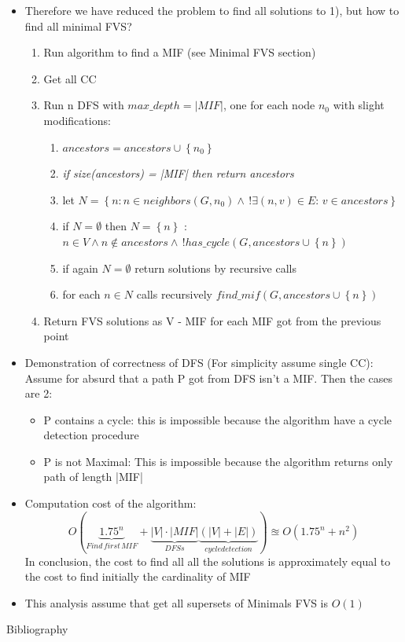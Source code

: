 \documentclass[11pt]{beamer}
\begin{document}
	\begin{frame}
		\begin{itemize}
			\item Therefore we have reduced the problem to find all solutions to 1), but how to find all minimal FVS?
			\begin{enumerate}
				\item Run algorithm to find a MIF (see Minimal FVS section)
				\item Get all CC
				\item Run n DFS with $ max\_depth=|MIF| $, one for each node $ n_0 $ with slight modifications:
				\begin{enumerate}
					\item $ ancestors = ancestors \cup \left\{ n_0 \right\} $
					\item \textit{if size(ancestors) = |MIF| then return ancestors}
					\item let $ N = \left\{ n: n \in neighbors(G, n_0) \wedge \, ! \exists (n,v) \in E: \, v \in ancestors \right\} $
					\item if $ N = \emptyset $ then $ N = \left\{ n \right\}  $ : $ n \in V \wedge n \notin ancestors \wedge \, ! has\_cycle(G, ancestors \cup \left\{ n \right\})$
					\item if again $ N = \emptyset $ return solutions by recursive calls
					\item for each $ n \in N $ calls recursively $ find\_mif \left( G, ancestors \cup \left\{ n \right\} \right) $
					
				\end{enumerate}
				\item Return FVS solutions as V - MIF for each MIF got from the previous point
			\end{enumerate}
		\end{itemize}
	\end{frame}
	\begin{frame}
		\begin{itemize}
			\item Demonstration of correctness of DFS (For simplicity assume single CC): Assume for absurd that a path P got from DFS isn't a MIF. Then the cases are 2:
			\begin{itemize}
				\item P contains a cycle: this is impossible because the algorithm have a cycle detection procedure
				\item  P is not Maximal: This is impossible because the algorithm returns only path of length |MIF|
			\end{itemize}
			\item Computation cost of the algorithm: $$ O( \underbrace{1.75 ^ n}_{Find \, first \, MIF} + \underbrace{|V| \cdot |MIF|}_{DFSs} \underbrace{\left( |V| + |E|\right) }_{cycle detection})  \approxeq O(1.75^n + n^2) $$
			 In conclusion, the cost to find all all the solutions is approximately equal to the cost to find initially the cardinality of MIF
			 \item This analysis assume that get all supersets of Minimals FVS is $ O(1) $ 
		 	\end{itemize}
	\end{frame}
	\begin{frame}{Bibliography}
		\printbibliography
	\end{frame}
\end{document}
